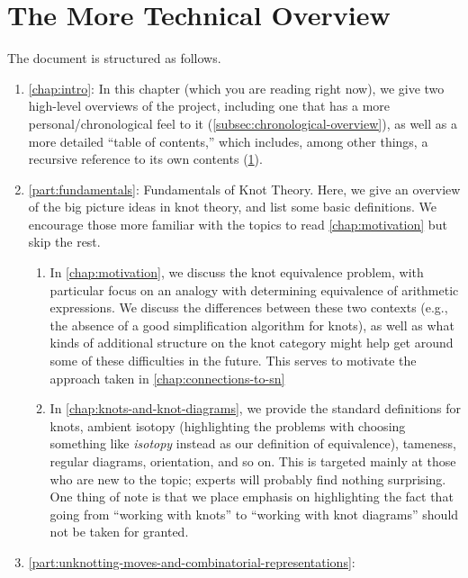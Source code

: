 \section{The More Technical
  Overview}\label{subsec:more-explicit-description}
The document is structured as follows.
\begin{enumerate}[label=(\Roman*)]
  \item \cref{chap:intro}: In this chapter (which you are reading
    right now), we give two high-level overviews of the project,
    including one that has a more personal/chronological feel to it
    (\cref{subsec:chronological-overview}), as well as a more detailed
    ``table of contents,'' which includes, among other things, a
    recursive reference to its own contents
    (\cref{subsec:more-explicit-description}).
  \item \cref{part:fundamentals}: Fundamentals of Knot Theory. Here,
    we give an overview of the big picture ideas in knot theory, and
    list some basic definitions. We encourage those more familiar with
    the topics to read \cref{chap:motivation} but skip the rest.
    \begin{enumerate}[label=\arabic*)]
      \item In \cref{chap:motivation}, we discuss the knot equivalence
        problem, with particular focus on an analogy with determining
        equivalence of arithmetic expressions. We discuss the
        differences between these two contexts (e.g., the absence of a
        good simplification algorithm for knots), as well as what
        kinds of additional structure on the knot category might help
        get around some of these difficulties in the future. This
        serves to motivate the approach taken in
        \cref{chap:connections-to-sn}
      \item In \cref{chap:knots-and-knot-diagrams}, we provide the
        standard definitions for knots, ambient isotopy (highlighting the
        problems with choosing something like \emph{isotopy} instead
        as our definition of equivalence), tameness, regular diagrams,
        orientation, and so on. This is targeted mainly at those who
        are new to the topic; experts will probably find nothing
        surprising. One thing of note is that we place emphasis on
        highlighting the fact that going from ``working with knots''
        to ``working with knot diagrams'' should not be taken for
        granted.
    \end{enumerate}
  \item
    \cref{part:unknotting-moves-and-combinatorial-representations}:

\end{enumerate}
